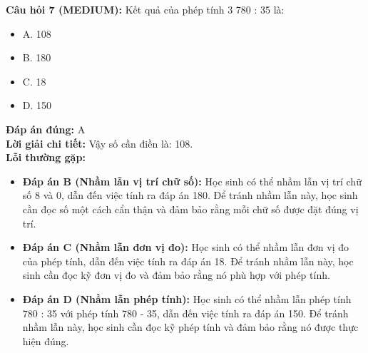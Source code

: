 \documentclass{article}
\begin{document}
\begin{minipage}{\textwidth}
\noindent\textbf{Câu hỏi 7 (MEDIUM):} Kết quả của phép tính 3 780 : 35 là: 
\begin{itemize}[label={}]
    \item A. 108
    \item B. 180
    \item C. 18
    \item D. 150
\end{itemize}
\textbf{Đáp án đúng:} A \\
\textbf{Lời giải chi tiết:} Vậy số cần điền là: 108. \\
\textbf{Lỗi thường gặp:}
\begin{itemize}
  \item \textbf{Đáp án B (Nhầm lẫn vị trí chữ số):} Học sinh có thể nhầm lẫn vị trí chữ số 8 và 0, dẫn đến việc tính ra đáp án 180. Để tránh nhầm lẫn này, học sinh cần đọc số một cách cẩn thận và đảm bảo rằng mỗi chữ số được đặt đúng vị trí.
  \item \textbf{Đáp án C (Nhầm lẫn đơn vị đo):} Học sinh có thể nhầm lẫn đơn vị đo của phép tính, dẫn đến việc tính ra đáp án 18. Để tránh nhầm lẫn này, học sinh cần đọc kỹ đơn vị đo và đảm bảo rằng nó phù hợp với phép tính.
  \item \textbf{Đáp án D (Nhầm lẫn phép tính):} Học sinh có thể nhầm lẫn phép tính 780 : 35 với phép tính 780 - 35, dẫn đến việc tính ra đáp án 150. Để tránh nhầm lẫn này, học sinh cần đọc kỹ phép tính và đảm bảo rằng nó được thực hiện đúng.
\end{itemize}
\end{minipage}
\vspace{1em}
\end{document}
